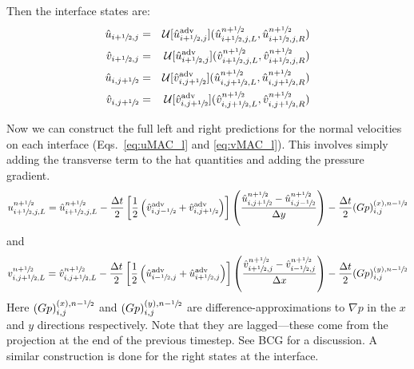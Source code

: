 Then the interface states are:
\begin{eqnarray}
\hat{u}_{i+{\sfrac{1}{2}},j} &=& \mathcal{U}[\hat{u}_{i+{\sfrac{1}{2}},j}^\mathrm{adv}]
             (\hat{u}_{i+{\sfrac{1}{2}},j,L}^{n+{\sfrac{1}{2}}}, \hat{u}_{i+{\sfrac{1}{2}},j,R}^{n+{\sfrac{1}{2}}} ) \\
\hat{v}_{i+{\sfrac{1}{2}},j} &=& \mathcal{U}[\hat{u}_{i+{\sfrac{1}{2}},j}^\mathrm{adv}]
             (\hat{v}_{i+{\sfrac{1}{2}},j,L}^{n+{\sfrac{1}{2}}}, \hat{v}_{i+{\sfrac{1}{2}},j,R}^{n+{\sfrac{1}{2}}} ) \\
\hat{u}_{i,j+{\sfrac{1}{2}}} &=& \mathcal{U}[\hat{v}_{i,j+{\sfrac{1}{2}}}^\mathrm{adv}]
             (\hat{u}_{i,j+{\sfrac{1}{2}},L}^{n+{\sfrac{1}{2}}}, \hat{u}_{i,j+{\sfrac{1}{2}},R}^{n+{\sfrac{1}{2}}} ) \\
\hat{v}_{i,j+{\sfrac{1}{2}}} &=& \mathcal{U}[\hat{v}_{i,j+{\sfrac{1}{2}}}^\mathrm{adv}]
             (\hat{v}_{i,j+{\sfrac{1}{2}},L}^{n+{\sfrac{1}{2}}}, \hat{v}_{i,j+{\sfrac{1}{2}},R}^{n+{\sfrac{1}{2}}} )
\end{eqnarray}

Now we can construct the full left and right predictions for the
normal velocities on each interface (Eqs.~\ref{eq:uMAC_l} and
\ref{eq:vMAC_l}).  This involves simply adding the transverse term to
the hat quantities and adding the pressure gradient.
\begin{equation}
u_{i+{\sfrac{1}{2}},j,L}^{n+{\sfrac{1}{2}}} = \hat{u}_{i+{\sfrac{1}{2}},j,L}^{n+{\sfrac{1}{2}}}
    - \frac{\Delta t}{2}
       \left [ \frac{1}{2} \left (\hat{v}^\mathrm{adv}_{i,j-{\sfrac{1}{2}}} +
                                  \hat{v}^\mathrm{adv}_{i,j+{\sfrac{1}{2}}} \right )
      \right ]
      \left ( \frac{\hat{u}_{i,j+{\sfrac{1}{2}}}^{n+{\sfrac{1}{2}}} -
                    \hat{u}_{i,j-{\sfrac{1}{2}}}^{n+{\sfrac{1}{2}}}}{\Delta y} \right )
    - \frac{\Delta t}{2} (Gp)^{(x),n-{\sfrac{1}{2}}}_{i,j}
\end{equation}
and
\begin{equation}
v_{i,j+{\sfrac{1}{2}},L}^{n+{\sfrac{1}{2}}} = \hat{v}_{i,j+{\sfrac{1}{2}},L}^{n+{\sfrac{1}{2}}}
    - \frac{\Delta t}{2}
       \left [ \frac{1}{2} \left (\hat{u}^\mathrm{adv}_{i-{\sfrac{1}{2}},j} +
                                  \hat{u}^\mathrm{adv}_{i+{\sfrac{1}{2}},j} \right )
      \right ]
      \left ( \frac{\hat{v}_{i+{\sfrac{1}{2}},j}^{n+{\sfrac{1}{2}}} -
                    \hat{v}_{i-{\sfrac{1}{2}},j}^{n+{\sfrac{1}{2}}}}{\Delta x} \right )
    - \frac{\Delta t}{2} (Gp)^{(y),n-{\sfrac{1}{2}}}_{i,j}
\end{equation}
Here $ (Gp)^{(x),n-{\sfrac{1}{2}}}_{i,j}$ and $ (Gp)^{(y),n-{\sfrac{1}{2}}}_{i,j}$ are
difference-approximations to $\nabla p$ in the $x$ and $y$
directions respectively.  Note that they are lagged---these come from
the projection at the end of the previous timestep.  See BCG for
a discussion.  A similar
construction is done for the right states at the interface.


